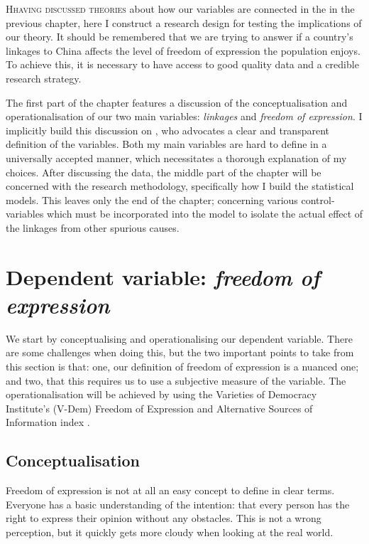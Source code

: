 \lettrine{H}{having discussed theories} about how our variables are connected in the in the previous chapter, here I construct a research design for testing the implications of our theory.  It should be remembered that we are trying to answer if a country's linkages to China affects the level of freedom of expression the population enjoys. To achieve this, it is necessary to have access to good quality data and a credible research strategy.

The first part of the chapter features a discussion of the conceptualisation and operationalisation of our two main variables: \textit{linkages} and \textit{freedom of expression}. I implicitly build this discussion on \citet{adcock_measurement_2001, gerring_what_1999}, who advocates a clear and transparent definition of the variables. Both my main variables are hard to define in a universally accepted manner, which necessitates a thorough explanation of my choices. After discussing the data, the middle part of the chapter will be concerned with the research methodology, specifically how I build the statistical models. This leaves only the end of the chapter; concerning various control-variables which must be incorporated into the model to isolate the actual effect of the linkages from other spurious causes. 

\section{Dependent variable: \textit{freedom of expression}}
We start by conceptualising and operationalising our dependent variable. There are some challenges when doing this, but the two important points to take from this section is that: one, our definition of freedom of expression is a nuanced one; and two, that this requires us to use a subjective measure of the variable. The operationalisation will be achieved by using the Varieties of Democracy Institute's (V-Dem) Freedom of Expression and Alternative Sources of Information index \citep{coppedge_v-dem_2025}. 

\subsection{Conceptualisation}
Freedom of expression is not at all an easy concept to define in clear terms. Everyone has a basic understanding of the intention: that every person has the right to express their opinion without any obstacles. This is not a wrong perception, but it quickly gets more cloudy when looking at the real world.

